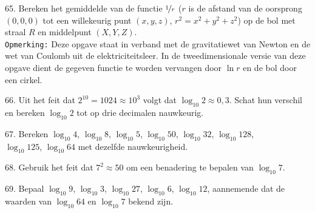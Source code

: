 \begin{problem}{65.}
	Bereken het gemiddelde van de functie $\nicefrac{1}{r}$ ($r$ is de afstand van de oorsprong $(0,0,0)$ tot een willekeurig punt $(x,y,z)$, $r^2 = x^2 + y^2 + z^2$) op de bol met straal $R$ en middelpunt $(X,Y,Z)$.\\

\noindent \texttt{Opmerking:} Deze opgave staat in verband met de gravitatiewet van Newton en de wet van Coulomb uit de elektriciteitsleer. In de twee\-dimensionale versie van deze opgave dient de gegeven functie te wor\-den vervangen door $\ln r$ en de bol door een cirkel.
\end{problem}

\begin{problem}{66.}
	Uit het feit dat $2^{10} = 1024 \approx {10}^3$ volgt dat $\log_{10} 2 \approx 0,3$. Schat hun verschil en bereken $\log_{10} 2$ tot op drie decimalen nauwkeurig.
\end{problem}

\begin{problem}{67.}
	Bereken $\log_{10} 4$, $\log_{10} 8$, $\log_{10} 5$, $\log_{10} 50$, $\log_{10} 32$, $\log_{10} 128$,\\$\log_{10} 125$, $\log_{10} 64$ met dezelfde nauwkeurigheid.
\end{problem}

\begin{problem}{68.}
	Gebruik het feit dat $7^2 \approx 50$ om een benadering te bepalen van $\log_{10} 7$.
\end{problem}

\begin{problem}{69.}
	Bepaal $\log_{10} 9$, $\log_{10} 3$, $\log_{10} 27$, $\log_{10} 6$, $\log_{10} 12$, aannemende dat de waarden van $\log_{10} 64$ en $\log_{10} 7$ bekend zijn.
\end{problem}

\clearpage

